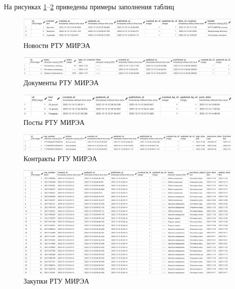 \documentclass{mirea}
\begin{document}
	На рисунках \ref{fig:full_mireanews}--\ref{fig:full_purchases} приведены примеры заполнения таблиц
	
	\begin{figure}[H]
		\centering
		\includegraphics[width=\textwidth]{full_mireanews}
		\parskip=6pt
		\caption{Новости РТУ МИРЭА}
		\label{fig:full_mireanews}
	\end{figure}

	\begin{figure}[H]
		\centering
		\includegraphics[width=\textwidth]{full_mireadocs}
		\parskip=6pt
		\caption{Документы РТУ МИРЭА}
	\end{figure}

	\begin{figure}[H]
		\centering
		\includegraphics[width=\textwidth]{full_vkposts}
		\parskip=6pt
		\caption{Посты РТУ МИРЭА}
	\end{figure}

	\begin{figure}[H]
		\centering
		\includegraphics[width=\textwidth]{full_contracts}
		\parskip=6pt
		\caption{Контракты РТУ МИРЭА}
	\end{figure}

	\begin{figure}[H]
		\centering
		\includegraphics[width=\textwidth]{full_purchases}
		\parskip=6pt
		\caption{Закупки РТУ МИРЭА}
		\label{fig:full_purchases}
	\end{figure}
	
\end{document}

